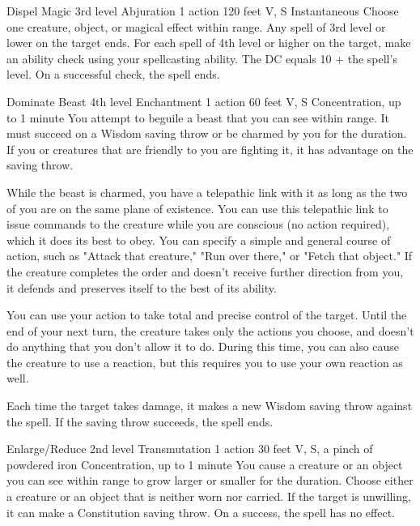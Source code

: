 \documentclass[10pt,a4paper,twoside,bg=print,twocolumn,openany,nodeprecatedcode]{dndbook}
\begin{document}


\DndSpellHeader%
{Dispel Magic}
{3rd level Abjuration}
{1 action}
{120 feet}
{V, S}
{Instantaneous}
Choose one creature, object, or magical effect within range. Any spell of 3rd level or lower on the target ends. For each spell of 4th level or higher on the target, make an ability check using your spellcasting ability. The DC equals 10 + the spell's level. On a successful check, the spell ends.



\DndSpellHeader%
{Dominate Beast}
{4th level Enchantment}
{1 action}
{60 feet}
{V, S}
{Concentration, up to 1 minute}
You attempt to beguile a beast that you can see within range. It must succeed on a Wisdom saving throw or be charmed by you for the duration. If you or creatures that are friendly to you are fighting it, it has advantage on the saving throw.

While the beast is charmed, you have a telepathic link with it as long as the two of you are on the same plane of existence. You can use this telepathic link to issue commands to the creature while you are conscious (no action required), which it does its best to obey. You can specify a simple and general course of action, such as "Attack that creature," "Run over there," or "Fetch that object." If the creature completes the order and doesn't receive further direction from you, it defends and preserves itself to the best of its ability.

You can use your action to take total and precise control of the target. Until the end of your next turn, the creature takes only the actions you choose, and doesn't do anything that you don't allow it to do. During this time, you can also cause the creature to use a reaction, but this requires you to use your own reaction as well.

Each time the target takes damage, it makes a new Wisdom saving throw against the spell. If the saving throw succeeds, the spell ends.



\DndSpellHeader%
{Enlarge/Reduce}
{2nd level Transmutation}
{1 action}
{30 feet}
{V, S, a pinch of powdered iron}
{Concentration, up to 1 minute}
You cause a creature or an object you can see within range to grow larger or smaller for the duration. Choose either a creature or an object that is neither worn nor carried. If the target is unwilling, it can make a Constitution saving throw. On a success, the spell has no effect.
\end{document}
